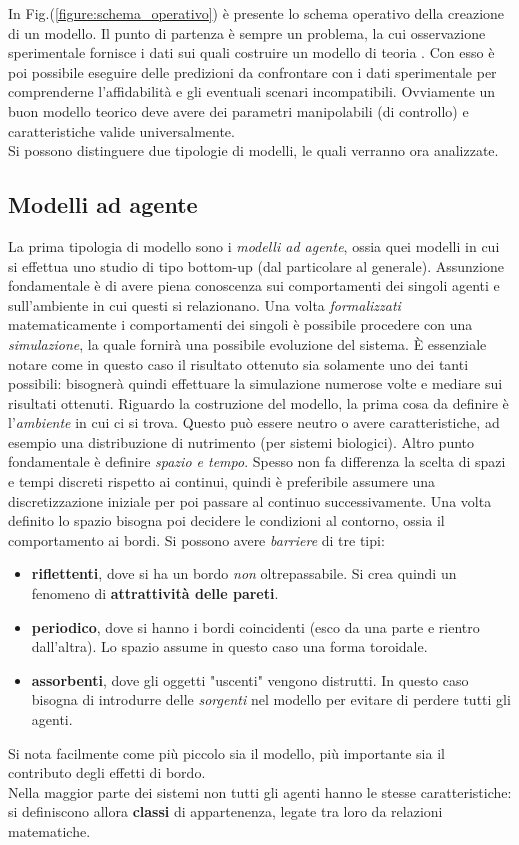 \documentclass[12pt, a4paper]{book}
\theoremstyle{theorem}
\begin{document}
			In Fig.(\ref{figure:schema_operativo}) è presente lo schema operativo della creazione di un modello.
			Il punto di partenza è sempre un problema, la cui osservazione sperimentale fornisce i dati sui quali costruire un modello di teoria .
			Con esso è poi possibile eseguire delle predizioni da confrontare con i dati sperimentale per comprenderne l'affidabilità e gli eventuali scenari incompatibili.
			Ovviamente un buon modello teorico deve avere dei parametri manipolabili (di controllo) e caratteristiche valide universalmente.
			\\
			Si possono distinguere due tipologie di modelli, le quali verranno ora analizzate.
			\subsection{Modelli ad agente}
				La prima tipologia di modello sono i \emph{modelli ad agente}, ossia quei modelli in cui si effettua uno studio di tipo bottom-up (dal particolare al generale).
				Assunzione fondamentale è di avere piena conoscenza sui comportamenti dei singoli agenti e sull'ambiente in cui questi si relazionano.
				Una volta \emph{formalizzati} matematicamente i comportamenti dei singoli è possibile procedere con una \emph{simulazione}, la quale fornirà una possibile evoluzione del sistema.
				È essenziale notare come in questo caso il risultato ottenuto sia solamente uno dei tanti possibili: bisognerà quindi effettuare la simulazione numerose volte e mediare sui risultati ottenuti.
				Riguardo la costruzione del modello, la prima cosa da definire è l'\textit{ambiente} in cui ci si trova. 
				Questo può essere neutro o avere caratteristiche, ad esempio una distribuzione di nutrimento (per sistemi biologici).
				Altro punto fondamentale è definire \textit{spazio e tempo}. 
				Spesso non fa differenza la scelta di spazi e tempi discreti rispetto ai continui, quindi è preferibile assumere una discretizzazione iniziale per poi passare al continuo successivamente.
				Una volta definito lo spazio bisogna poi decidere le condizioni al contorno, ossia il comportamento ai bordi. 
				Si possono avere \textit{barriere} di tre tipi:
				\begin{itemize}
					\item \textbf{riflettenti}, dove si ha un bordo \textit{non} oltrepassabile. Si crea quindi un fenomeno di \textbf{attrattività delle pareti}.
					\item \textbf{periodico}, dove si hanno i bordi coincidenti (esco da una parte e rientro dall'altra). Lo spazio assume in questo caso una forma toroidale.
					\item \textbf{assorbenti}, dove gli oggetti "uscenti" vengono distrutti. In questo caso bisogna di introdurre delle \textit{sorgenti} nel modello per evitare di perdere tutti gli agenti.
				\end{itemize}
				Si nota facilmente come più piccolo sia il modello, più importante sia il contributo degli effetti di bordo.\\
				Nella maggior parte dei sistemi non tutti gli agenti hanno le stesse caratteristiche: si definiscono allora \textbf{classi} di appartenenza, legate tra loro da relazioni matematiche.
\end{document}
